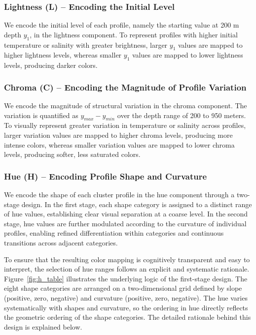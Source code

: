 \documentclass[11pt]{article}
\theoremstyle{plain}
\begin{document}
\subsubsection*{Lightness (L) – Encoding the Initial Level}
We encode the initial level of each profile, namely the starting value at 200 m depth $y_1$, in the lightness component. To represent profiles with higher initial temperature or salinity with greater brightness, larger $y_1$ values are mapped to higher lightness levels, whereas smaller $y_1$ values are mapped to lower lightness levels, producing darker colors. 

\subsubsection*{Chroma (C) – Encoding the Magnitude of Profile Variation}
We encode the magnitude of structural variation in the chroma component. The variation is quantified as $y_{max} - y_{min}$ over the depth range of 200 to 950 meters. To visually represent greater variation in temperature or salinity across profiles, larger variation values are mapped to higher chroma levels, producing more intense colors, whereas smaller variation values are mapped to lower chroma levels, producing softer, less saturated colors.


\subsubsection*{Hue (H) – Encoding Profile Shape and Curvature} 
We encode the shape of each cluster profile in the hue component through a two-stage design. In the first stage, each shape category is assigned to a distinct range of hue values, establishing clear visual separation at a coarse level. In the second stage, hue values are further modulated according to the curvature of individual profiles, enabling refined differentiation within categories and continuous transitions across adjacent categories.

To ensure that the resulting color mapping is cognitively transparent and easy to interpret, the selection of hue ranges follows an explicit and systematic rationale. Figure~\ref{fig:h_table} illustrates the underlying logic of the first-stage design. The eight shape categories are arranged on a two-dimensional grid defined by slope (positive, zero, negative) and curvature (positive, zero, negative). The hue varies systematically with shapes and curvature, so the ordering in hue directly reflects the geometric ordering of the shape categories. The detailed rationale behind this design is explained below.
\end{document}
